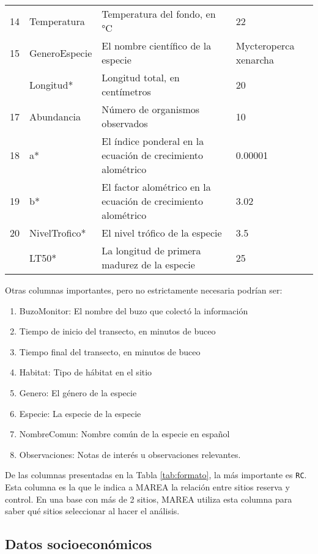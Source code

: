 \documentclass[]{krantz}
\providecommand{\tightlist}{%
  \setlength{\itemsep}{0pt}\setlength{\parskip}{0pt}}
\begin{document}
\begin{table}[t]
\begin{tabular}{rlll}
14 & Temperatura & Temperatura del fondo, en °C & 22\\
15 & GeneroEspecie & El nombre científico de la especie & Mycteroperca xenarcha\\
\addlinespace
16 & Longitud* & Longitud total, en centímetros & 20\\
17 & Abundancia & Número de organismos observados & 10\\
18 & a* & El índice ponderal en la ecuación de crecimiento alométrico & 0.00001\\
19 & b* & El factor alométrico en la ecuación de crecimiento alométrico & 3.02\\
20 & NivelTrofico* & El nivel trófico de la especie & 3.5\\
\addlinespace
21 & LT50* & La longitud de primera madurez de la especie & 25\\
\bottomrule
\end{tabular}
\end{table}

Otras columnas importantes, pero no estrictamente necesaria podrían ser:

\begin{enumerate}
\def\labelenumi{\arabic{enumi}.}
\tightlist
\item
  BuzoMonitor: El nombre del buzo que colectó la información
\item
  Tiempo de inicio del transecto, en minutos de buceo
\item
  Tiempo final del transecto, en minutos de buceo
\item
  Habitat: Tipo de hábitat en el sitio
\item
  Genero: El género de la especie
\item
  Especie: La especie de la especie
\item
  NombreComun: Nombre común de la especie en español
\item
  Observaciones: Notas de interés u observaciones relevantes.
\end{enumerate}

De las columnas presentadas en la Tabla \ref{tab:formato}, la más importante es \texttt{RC}. Esta columna es la que le indica a MAREA la relación entre sitios reserva y control. En una base con más de 2 sitios, MAREA utiliza esta columna para saber qué sitios seleccionar al hacer el análisis.

\hypertarget{datos-socioeconomicos}{%
\subsection{Datos socioeconómicos}\label{datos-socioeconomicos}}
\end{document}
